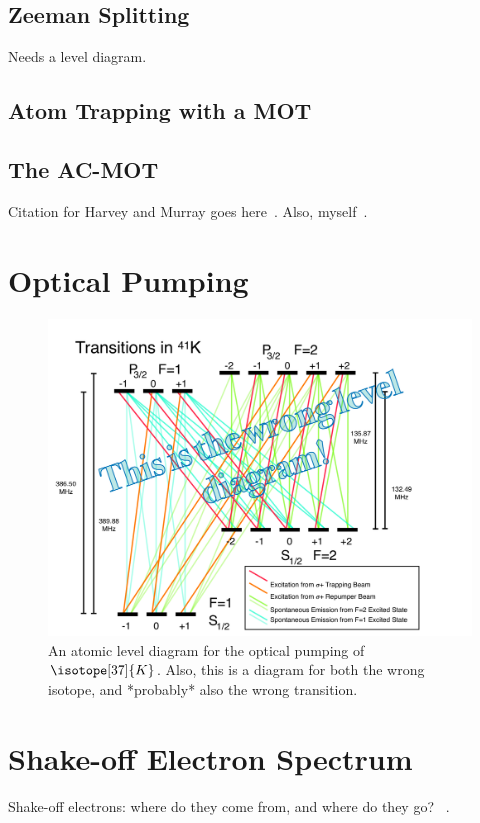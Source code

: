 	\subsection{Zeeman Splitting}
	Needs a level diagram.
	\subsection{Atom Trapping with a MOT}
	\subsection{The AC-MOT}
	Citation for Harvey and Murray goes here~\cite{harveymurray}.  Also, myself~\cite{thesis}.

\section{Optical Pumping}
\begin{figure}[h!!t]
	\centering
	\includegraphics[width=.999\linewidth]
	{Figures/OP_LevelDiagram}
	\caption{An atomic level diagram for the optical pumping of $\isotope[37]{K}$.  Also, this is a diagram for both the wrong isotope, and *probably* also the wrong transition.}	
	\label{fig:op_leveldiagram}
\end{figure}


\section{Shake-off Electron Spectrum}
Shake-off electrons:  where do they come from, and where do they go?  ~\cite{Levinger}.

